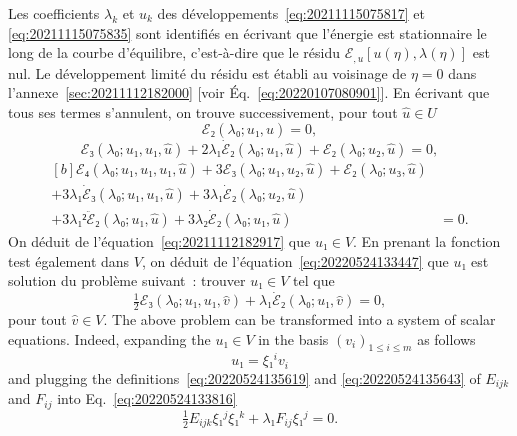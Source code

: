 \documentclass[12pt, final]{scrartcl}
\theoremstyle{definition}
\begin{document}
Les coefficients \(λ_k\) et \(u_k\) des développements~\eqref{eq:20211115075817}
et \eqref{eq:20211115075835} sont identifiés en écrivant que l'énergie est
stationnaire le long de la courbe d'équilibre, c'est-à-dire que le résidu
\(ℰ_{, u} [u(η), λ(η)]\) est nul. Le développement limité du résidu est établi
au voisinage de \(η = 0\) dans l'annexe~\ref{sec:20211112182000} [voir
Éq.~\eqref{eq:20220107080901}]. En écrivant que tous ses termes s'annulent, on
trouve successivement, pour tout \(\hat{u}∈U\)
\begin{equation}
  \label{eq:20211112182917}
  ℰ₂(λ₀; u₁, \hat{u}) = 0,
\end{equation}
\begin{equation}
  \label{eq:20220524133447}
  ℰ₃(λ₀; u₁, u₁, \hat{u}) + 2λ₁\dot{ℰ}₂(λ₀; u₁, \hat{u}) + ℰ₂(λ₀; u₂, \hat{u}) = 0,
\end{equation}
\begin{equation}
  \label{eq:20220708060436}
  \begin{aligned}[b]
    ℰ₄(λ₀; u₁, u₁, u₁, \hat{u}) + 3ℰ₃(λ₀; u₁, u₂, \hat{u}) + ℰ₂(λ₀; u₃, \hat{u})&\\
    + 3λ₁\dot{ℰ}₃(λ₀; u₁, u₁, \hat{u}) + 3λ₁\dot{ℰ}₂(λ₀;  u₂, \hat{u})&\\
    + 3λ₁²\ddot{ℰ}₂(λ₀; u₁, \hat{u}) + 3λ₂\dot{ℰ}₂(λ₀; u₁, \hat{u}) & = 0.
  \end{aligned}
\end{equation}
On déduit de l'équation~\eqref{eq:20211112182917} que \(u₁∈V\). En prenant la
fonction test également dans \(V\), on déduit de
l'équation~\eqref{eq:20220524133447} que \(u₁\) est solution du problème
suivant~: trouver \(u₁∈V\) tel que
\begin{equation}
  \label{eq:20220524133816}
  \tfrac{1}{2} ℰ₃(λ₀; u₁, u₁, \hat{v}) + λ₁\dot{ℰ}₂(λ₀; u₁, \hat{v}) = 0,
\end{equation}
pour tout \(\hat{v}∈V\). The above problem can be transformed into a system of
scalar equations. Indeed, expanding the \(u₁∈V\) in the basis
\((v_i)_{1 ≤ i ≤ m}\) as follows
\begin{equation}
  \label{eq:20220524133944}
  u₁ = ξ₁^i v_i
\end{equation}
and plugging the definitions~\eqref{eq:20220524135619} and
\eqref{eq:20220524135643} of \(E_{ijk}\) and \(F_{ij}\) into
Eq.~\eqref{eq:20220524133816}
\begin{equation}
  \label{eq:20220524135036}
  \tfrac{1}{2} E_{ijk} ξ₁^j ξ₁^k + λ₁ F_{ij} ξ₁^j = 0.
\end{equation}
\end{document}
